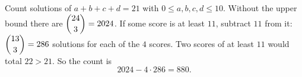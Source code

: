 Count solutions of $a+b+c+d=21$ with $0\le a,b,c,d\le10$. Without the upper bound there are $\dbinom{24}{3}=2024$. If some score is at least $11$, subtract $11$ from it: $\dbinom{13}{3}=286$ solutions for each of the $4$ scores. Two scores of at least $11$ would total $22>21$. So the count is
\[2024-4\cdot286=\boxed{880}.\]
